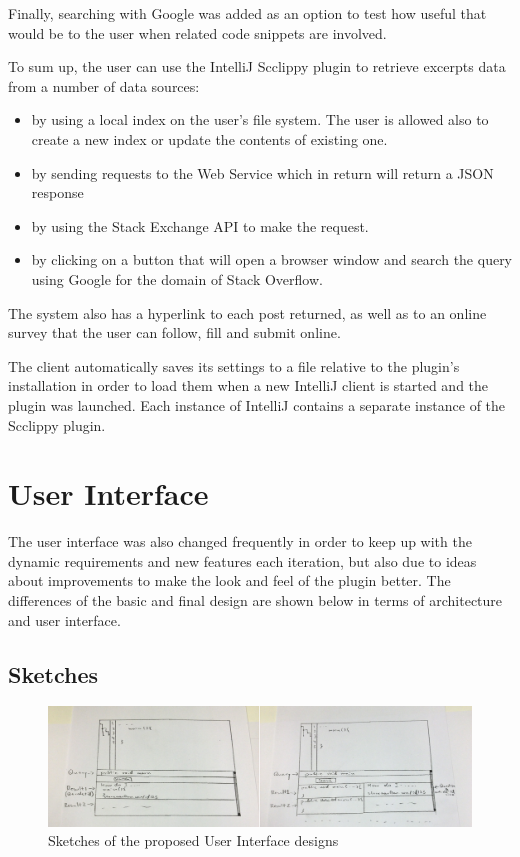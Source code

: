 \documentclass{l4proj}
\begin{document}
Finally, searching with Google was added as an option to test how useful that would be to the user when related code snippets are involved.

To sum up, the user can use the IntelliJ Scclippy plugin to retrieve excerpts data from a number of data sources:

\begin{itemize}
\item by using a local index on the user's file system. The user is allowed also to create a new index or update the contents of existing one. 
\item by sending requests to the Web Service which in return will return a JSON response
\item by using the Stack Exchange API to make the request.
\item by clicking on a button that will open a browser window and search the query using Google for the domain of Stack Overflow. 
\end{itemize}

The system also has a hyperlink to each post returned, as well as to an online survey that the user can follow, fill and submit online. 

The client automatically saves its settings to a file relative to the plugin's installation in order to load them when a new IntelliJ client is started and the plugin was launched. Each instance of IntelliJ contains a separate instance of the Scclippy plugin.

\section{User Interface}
The user interface was also changed frequently in order to keep up with the dynamic requirements and new features each iteration, but also due to ideas about improvements to make the look and feel of the plugin better. The differences of the basic and final design are shown below in terms of architecture and user interface.

\subsection{Sketches}

\begin{figure}[H]
\includegraphics[scale=0.2]{sketches}
\centering
\caption{Sketches of the proposed User Interface designs}\label{sketches}
\label{fig:sketches}
\end{figure}
\end{document}
